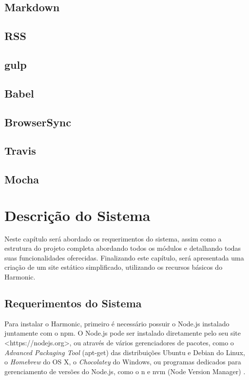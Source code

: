 \documentclass[ppginf, pep]{esinucpel}
\begin{document}
\section{Markdown}

\section{RSS}

\section{gulp}

\section{Babel}

\section{BrowserSync}

\section{Travis}

\section{Mocha}

\chapter{Descrição do Sistema}

Neste capítulo será abordado os requerimentos do sistema, assim como a estrutura do projeto completa abordando todos os módulos e detalhando todas suas funcionalidades oferecidas. Finalizando este capítulo, será apresentada uma criação de um site estático simplificado, utilizando os recursos básicos do Harmonic.

\section{Requerimentos do Sistema}

Para instalar o Harmonic, primeiro é necessário possuir o Node.js instalado juntamente com o npm. O Node.js pode ser instalado diretamente pelo seu site <https://nodejs.org>, ou através de vários gerenciadores de pacotes, como o \textit{Advanced Packaging Tool} (apt-get) das distribuições Ubuntu e Debian do Linux, o \textit{Homebrew} do OS X, o \textit{Chocolatey} do Windows, ou programas dedicados para gerenciamento de versões do Node.js, como o n \cite{n} e nvm (Node Version Manager) \cite{nvm}.
\end{document}
